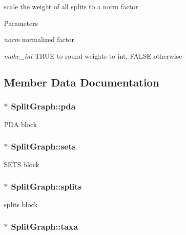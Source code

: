\label{classSplitGraph_aaa150a66ac97d6170336a9c74ffecc88}
scale the weight of all splits to a norm factor 
\begin{DoxyParams}{Parameters}
\item[{\em norm}]normalized factor \item[{\em make\_\-int}]TRUE to round weights to int, FALSE otherwise \end{DoxyParams}


\subsection{Member Data Documentation}
\hypertarget{classSplitGraph_ab5bb72994879bbc43abf1b48f1278c21}{
\subsubsection[{pda}]{$\ast$ {\bf SplitGraph::pda}}}
\label{classSplitGraph_ab5bb72994879bbc43abf1b48f1278c21}
PDA block \hypertarget{classSplitGraph_ac46902cb0a5a2c914c657f0434d004bd}{
\subsubsection[{sets}]{$\ast$ {\bf SplitGraph::sets}}}
\label{classSplitGraph_ac46902cb0a5a2c914c657f0434d004bd}
SETS block \hypertarget{classSplitGraph_a42f7001d83a322db0b47a4bab44eeebd}{
\subsubsection[{splits}]{$\ast$ {\bf SplitGraph::splits}}}
\label{classSplitGraph_a42f7001d83a322db0b47a4bab44eeebd}
splits block \hypertarget{classSplitGraph_a3166d128ac9e267baf86d309deadb988}{
\subsubsection[{taxa}]{$\ast$ {\bf SplitGraph::taxa}}}
